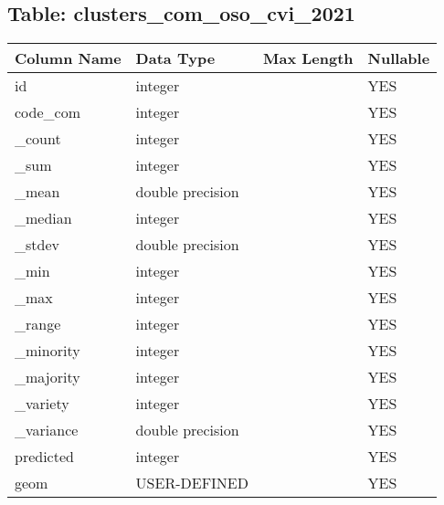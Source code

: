 \subsection*{Table: clusters_com_oso_cvi_2021}
\begin{tabular}{llll}
\hline
 Column Name   & Data Type        & Max Length   & Nullable   \\
\hline
 id            & integer          &              & YES        \\
 code_com      & integer          &              & YES        \\
 _count        & integer          &              & YES        \\
 _sum          & integer          &              & YES        \\
 _mean         & double precision &              & YES        \\
 _median       & integer          &              & YES        \\
 _stdev        & double precision &              & YES        \\
 _min          & integer          &              & YES        \\
 _max          & integer          &              & YES        \\
 _range        & integer          &              & YES        \\
 _minority     & integer          &              & YES        \\
 _majority     & integer          &              & YES        \\
 _variety      & integer          &              & YES        \\
 _variance     & double precision &              & YES        \\
 predicted     & integer          &              & YES        \\
 geom          & USER-DEFINED     &              & YES        \\
\hline
\end{tabular}
